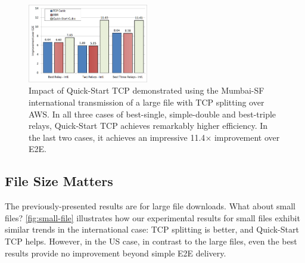 \documentclass[sigconf,usenames,dvipsnames,geometry]{acmart}
\newcommand{\mycomm}[3]{{\color{#2} \textbf{[#1: #3]}}}
\newcommand{\mycomm}[3]{}
\newcommand{\IK}[1]{\mycomm{IK}{blue}{#1}}
\newcommand{\AB}[1]{\mycomm{AB}{Orange}{#1}}
\newcommand{\NR}[1]{\mycomm{NR}{OliveGreen}{#1}}
\begin{document}







\begin{figure}[!t]
  \centering
    \includegraphics[width=0.47\textwidth,trim=2mm 2mm 2mm 2mm,clip]{figures/aggressive.png}
    \caption{Impact of Quick-Start TCP demonstrated using the Mumbai-SF international transmission of a large file with TCP splitting over AWS. In all three cases of best-single, simple-double and best-triple relays, Quick-Start TCP achieves remarkably higher efficiency. In the last two cases, it achieves an impressive 11.4$\times$ improvement over E2E.
   }
    \label{fig:aggressive}
\end{figure}





\subsection{File Size Matters}
The previously-presented results are for large file downloads. What about small files? \autoref{fig:small-file} illustrates how our experimental results for small files exhibit similar trends in the international case: TCP splitting is better, and Quick-Start TCP helps. However, in the US case, in contrast to the large files, even the best results provide no improvement beyond simple E2E delivery. 
\end{document}
